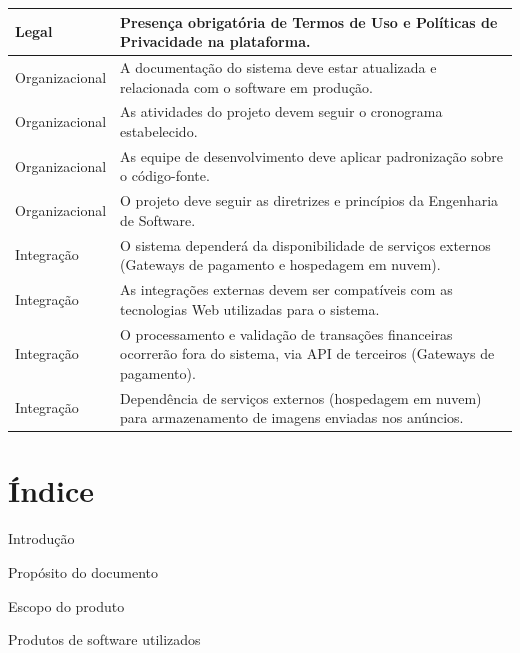 ﻿\documentclass[12pt,a4paper]{article}
\begin{document}
\begin{longtable}{|l|p{9.5cm}|}
Legal & Presença obrigatória de Termos de Uso e Políticas de Privacidade na plataforma. \\
\hline

Organizacional & A documentação do sistema deve estar atualizada e relacionada com o software em produção. \\
\hline

Organizacional & As atividades do projeto devem seguir o cronograma estabelecido. \\
\hline

Organizacional & As equipe de desenvolvimento deve aplicar padronização sobre o código-fonte. \\
\hline

Organizacional & O projeto deve seguir as diretrizes e princípios da Engenharia de Software. \\
\hline

Integração & O sistema dependerá da disponibilidade de serviços externos (Gateways de pagamento e hospedagem em nuvem). \\
\hline

Integração & As integrações externas devem ser compatíveis com as tecnologias Web utilizadas para o sistema. \\
\hline

Integração & O processamento e validação de transações financeiras ocorrerão fora do sistema, via API de terceiros (Gateways de pagamento). \\
\hline

Integração & Dependência de serviços externos (hospedagem em nuvem) para armazenamento de imagens enviadas nos anúncios. \\
\hline

\end{longtable}

\clearpage
\section{Índice}
\label{sec:Indice}

Introdução\dotfill \pageref{sec:Introducao}

\hspace{1cm}Propósito do documento\dotfill \pageref{sec:Proposito}

\hspace{1cm}Escopo do produto\dotfill \pageref{sec:Escopo}

\hspace{2cm}Produtos de software utilizados\dotfill \pageref{sec:Produtos}
\end{document}
